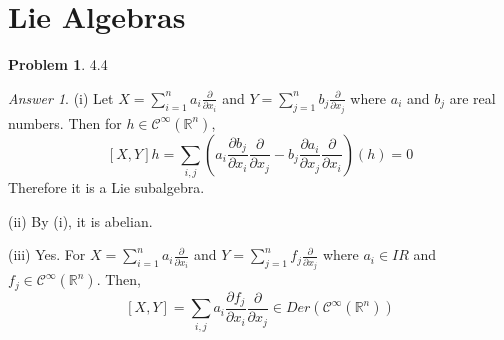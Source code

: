 \documentclass[10pt,a4paper]{article}
\theoremstyle{plain}
\theoremstyle{definition}
\newtheorem*{problem*}{Problem}
\theoremstyle{remark}
\newtheorem*{answer*}{Answer}
\newcommand{\sC}{\mathcal{C}}
\newcommand{\IR}{\mathbb{R}}
\newcommand{\<}{\langle}
\renewcommand{\>}{\rangle}
\newcommand{\p}{\partial}
\begin{document}
\section*{Lie Algebras}
\label{sec:Lie Algebras}

\begin{problem*} 4.4
\end{problem*}

\begin{answer*}\hfill

(i) Let $X= \sum_{i=1}^n a_i \frac{\p}{\p x_i}$ and $Y = \sum_{j=1}^n b_j \frac{\p}{\p x_j}$ where $a_i$ and $b_j$ are real numbers. Then for $h\in \sC^\infty(\IR^n)$,
\[[X,Y]h = \sum_{i,j} (a_i \frac{\p b_j}{\p x_i}\frac{\p}{\p x_j}  - b_j \frac{\p a_i}{\p x_j}\frac{\p}{\p x_i})(h) = 0\]
Therefore it is a Lie subalgebra.

(ii) By (i), it is abelian.

(iii) Yes. For $X= \sum_{i=1}^n a_i \frac{\p}{\p x_i}$ and $Y = \sum_{j=1}^n f_j \frac{\p}{\p x_j}$ where $a_i\in IR$ and $f_j\in \sC^\infty(\IR^n)$. Then,
\[[X,Y] = \sum_{i,j} a_i\frac{\p f_j}{\p x_i}\frac{\p }{\p x_j} \in Der(\sC^\infty(\IR^n))\]
\end{answer*}
\end{document}
